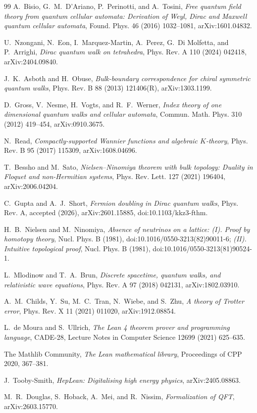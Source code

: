\documentclass[11pt]{article}
\begin{document}
\begin{thebibliography}{99}
A.~Bisio, G.~M.~D'Ariano, P.~Perinotti, and A.~Tosini,
\emph{Free quantum field theory from quantum cellular automata: Derivation of
Weyl, Dirac and Maxwell quantum cellular automata},
Found. Phys. 46 (2016) 1032--1081, arXiv:1601.04832.

U.~Nzongani, N.~Eon, I.~Marquez-Martin, A.~Perez, G.~Di Molfetta, and
P.~Arrighi,
\emph{Dirac quantum walk on tetrahedra},
Phys. Rev. A 110 (2024) 042418, arXiv:2404.09840.

J.~K.~Asboth and H.~Obuse,
\emph{Bulk-boundary correspondence for chiral symmetric quantum walks},
Phys. Rev. B 88 (2013) 121406(R), arXiv:1303.1199.

D.~Gross, V.~Nesme, H.~Vogts, and R.~F.~Werner,
\emph{Index theory of one dimensional quantum walks and cellular automata},
Commun. Math. Phys. 310 (2012) 419--454, arXiv:0910.3675.

N.~Read,
\emph{Compactly-supported Wannier functions and algebraic $K$-theory},
Phys. Rev. B 95 (2017) 115309, arXiv:1608.04696.

T.~Bessho and M.~Sato,
\emph{Nielsen--Ninomiya theorem with bulk topology: Duality in Floquet and
non-Hermitian systems}, Phys. Rev. Lett. 127 (2021) 196404,
arXiv:2006.04204.

C.~Gupta and A.~J.~Short,
\emph{Fermion doubling in Dirac quantum walks},
Phys. Rev. A, accepted (2026), arXiv:2601.15885,
doi:10.1103/kkz3-fthm.

H.~B.~Nielsen and M.~Ninomiya,
\emph{Absence of neutrinos on a lattice: (I). Proof by homotopy theory},
Nucl. Phys. B (1981), doi:10.1016/0550-3213(82)90011-6;
\emph{(II). Intuitive topological proof},
Nucl. Phys. B (1981), doi:10.1016/0550-3213(81)90524-1.

L.~Mlodinow and T.~A.~Brun,
\emph{Discrete spacetime, quantum walks, and relativistic wave equations},
Phys. Rev. A 97 (2018) 042131, arXiv:1802.03910.

A.~M.~Childs, Y.~Su, M.~C.~Tran, N.~Wiebe, and S.~Zhu,
\emph{A theory of Trotter error}, Phys. Rev. X 11 (2021) 011020,
arXiv:1912.08854.

L.~de Moura and S.~Ullrich,
\emph{The Lean 4 theorem prover and programming language},
CADE-28, Lecture Notes in Computer Science 12699 (2021) 625--635.

The Mathlib Community,
\emph{The Lean mathematical library}, Proceedings of CPP 2020, 367--381.

J.~Tooby-Smith,
\emph{HepLean: Digitalising high energy physics}, arXiv:2405.08863.

M.~R.~Douglas, S.~Hoback, A.~Mei, and R.~Nissim,
\emph{Formalization of QFT}, arXiv:2603.15770.

\end{thebibliography}
\end{document}
